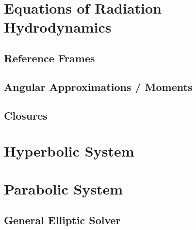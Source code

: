 \label{ch:radiation}

\section{Equations of Radiation Hydrodynamics}

\subsection{Reference Frames}

\subsection{Angular Approximations / Moments}

\subsection{Closures}



\section{Hyperbolic System}



\section{Parabolic System}

\subsection{General Elliptic Solver}

\label{sec:rad:generalelliptic}

